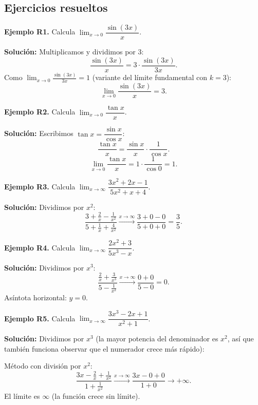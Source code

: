 \documentclass[12pt, a4paper]{article}
\begin{document}
\subsection{Ejercicios resueltos}

\textbf{Ejemplo R1.} Calcula $\lim_{x \to 0} \dfrac{\sin(3x)}{x}$.

\begin{cuadrosolucion}
  \textbf{Solución:} Multiplicamos y dividimos por 3:
  $$\frac{\sin(3x)}{x} = 3 \cdot \frac{\sin(3x)}{3x}.$$
  Como $\lim_{x \to 0} \frac{\sin(3x)}{3x} = 1$ (variante del límite fundamental con $k = 3$):
  $$\lim_{x \to 0} \frac{\sin(3x)}{x} = 3.$$
\end{cuadrosolucion}

\textbf{Ejemplo R2.} Calcula $\lim_{x \to 0} \dfrac{\tan x}{x}$.

\begin{cuadrosolucion}
  \textbf{Solución:} Escribimos $\tan x = \dfrac{\sin x}{\cos x}$:
  $$\frac{\tan x}{x} = \frac{\sin x}{x} \cdot \frac{1}{\cos x}.$$
  $$\lim_{x \to 0} \frac{\tan x}{x} = 1 \cdot \frac{1}{\cos 0} = 1.$$
\end{cuadrosolucion}

\textbf{Ejemplo R3.} Calcula $\lim_{x \to \infty} \dfrac{3x^2 + 2x - 1}{5x^2 + x + 4}$.

\begin{cuadrosolucion}
  \textbf{Solución:} Dividimos por $x^2$:
  $$\frac{3 + \frac{2}{x} - \frac{1}{x^2}}{5 + \frac{1}{x} + \frac{4}{x^2}} \xrightarrow{x \to \infty} \frac{3 + 0 - 0}{5 + 0 + 0} = \frac{3}{5}.$$
\end{cuadrosolucion}

\textbf{Ejemplo R4.} Calcula $\lim_{x \to \infty} \dfrac{2x^2 + 3}{5x^3 - x}$.

\begin{cuadrosolucion}
  \textbf{Solución:} Dividimos por $x^3$:
  $$\frac{\frac{2}{x} + \frac{3}{x^3}}{5 - \frac{1}{x^2}} \xrightarrow{x \to \infty} \frac{0 + 0}{5 - 0} = 0.$$
  Asíntota horizontal: $y = 0$.
\end{cuadrosolucion}
\newpage
\textbf{Ejemplo R5.} Calcula $\lim_{x \to \infty} \dfrac{3x^3 - 2x + 1}{x^2 + 1}$.

\begin{cuadrosolucion}
  \textbf{Solución:} Dividimos por $x^3$ (la mayor potencia del denominador es $x^2$, así que también funciona observar que el numerador crece más rápido):

  Método con división por $x^2$:
  $$\frac{3x - \frac{2}{x} + \frac{1}{x^2}}{1 + \frac{1}{x^2}} \xrightarrow{x \to \infty} \frac{3x - 0 + 0}{1 + 0} \to +\infty.$$
  El límite es $\infty$ (la función crece sin límite).
\end{cuadrosolucion}
\end{document}
